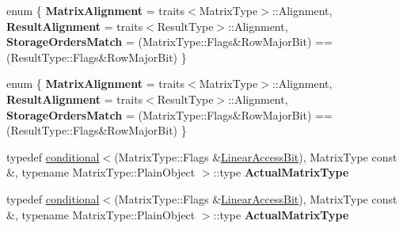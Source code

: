 \begin{DoxyCompactItemize}
\item 
\mbox{\label{struct_eigen_1_1internal_1_1compute__inverse__size4_3_01_architecture_1_1_s_s_e_00_01float_00_011c9f0f9df97321dfc4664a6d9e4a8f31_ab398ec185fe84a9a50af54c668730e53}} 
enum \{ {\bfseries Matrix\+Alignment} = traits$<$Matrix\+Type$>$\+:\+:Alignment, 
{\bfseries Result\+Alignment} = traits$<$Result\+Type$>$\+:\+:Alignment, 
{\bfseries Storage\+Orders\+Match} = (Matrix\+Type\+:\+:Flags\&Row\+Major\+Bit) == (Result\+Type\+:\+:Flags\&Row\+Major\+Bit)
 \}
\item 
\mbox{\label{struct_eigen_1_1internal_1_1compute__inverse__size4_3_01_architecture_1_1_s_s_e_00_01float_00_011c9f0f9df97321dfc4664a6d9e4a8f31_a2582595c56c61d411f7fe869a6eaf9f9}} 
enum \{ {\bfseries Matrix\+Alignment} = traits$<$Matrix\+Type$>$\+:\+:Alignment, 
{\bfseries Result\+Alignment} = traits$<$Result\+Type$>$\+:\+:Alignment, 
{\bfseries Storage\+Orders\+Match} = (Matrix\+Type\+:\+:Flags\&Row\+Major\+Bit) == (Result\+Type\+:\+:Flags\&Row\+Major\+Bit)
 \}
\item 
\mbox{\label{struct_eigen_1_1internal_1_1compute__inverse__size4_3_01_architecture_1_1_s_s_e_00_01float_00_011c9f0f9df97321dfc4664a6d9e4a8f31_a3b9b2332c19ad1337922138ef2b4a011}} 
typedef \hyperlink{struct_eigen_1_1internal_1_1conditional}{conditional}$<$(Matrix\+Type\+::\+Flags \&\hyperlink{group__flags_ga4b983a15d57cd55806df618ac544d09e}{Linear\+Access\+Bit}), Matrix\+Type const \&, typename Matrix\+Type\+::\+Plain\+Object $>$\+::type {\bfseries Actual\+Matrix\+Type}
\item 
\mbox{\label{struct_eigen_1_1internal_1_1compute__inverse__size4_3_01_architecture_1_1_s_s_e_00_01float_00_011c9f0f9df97321dfc4664a6d9e4a8f31_a3b9b2332c19ad1337922138ef2b4a011}} 
typedef \hyperlink{struct_eigen_1_1internal_1_1conditional}{conditional}$<$(Matrix\+Type\+::\+Flags \&\hyperlink{group__flags_ga4b983a15d57cd55806df618ac544d09e}{Linear\+Access\+Bit}), Matrix\+Type const \&, typename Matrix\+Type\+::\+Plain\+Object $>$\+::type {\bfseries Actual\+Matrix\+Type}
\end{DoxyCompactItemize}
